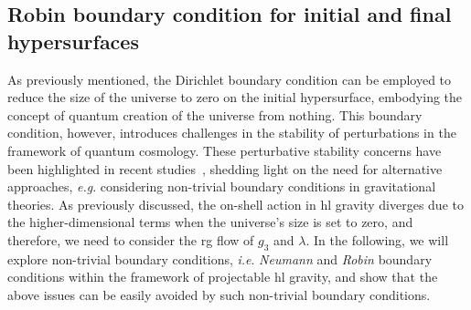 \documentclass[superscriptaddress,aps,preprintnumbers,nofootinbib]{revtex4-2}
\begin{document}
\subsection{Robin boundary condition for initial and final hypersurfaces}


As previously mentioned, the Dirichlet boundary condition can be employed to reduce the size of the universe to zero on the initial hypersurface, embodying the concept of quantum creation of the universe from nothing. This boundary condition, however, introduces challenges in the stability of perturbations in the framework of quantum cosmology. These perturbative stability concerns have been highlighted in recent studies~\cite{Feldbrugge:2017fcc,Feldbrugge:2017mbc,Matsui:2022lfj}, shedding light on the need for alternative approaches, \textit{e.g}. considering non-trivial boundary conditions in gravitational theories. As previously discussed, the on-shell action in \ac{hl} gravity diverges due to the higher-dimensional terms when the universe's size is set to zero, and therefore, we need to consider the \ac{rg} flow of $g_{3}$ and $\lambda$. In the following, we will explore non-trivial boundary conditions, \textit{i.e}. \emph{Neumann} and \emph{Robin} boundary conditions within the framework of projectable \ac{hl} gravity, and show that the above issues can be easily avoided by such non-trivial boundary conditions.
\end{document}
